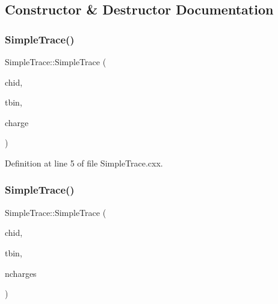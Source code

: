 \subsection{Constructor \& Destructor Documentation}
\mbox{\label{class_wire_cell_1_1_simple_trace_aabf3ae415f8952a19073c58de4702018}} 
\subsubsection{\texorpdfstring{Simple\+Trace()}{SimpleTrace()}\hspace{0.1cm}{\footnotesize\ttfamily [1/2]}}
{\footnotesize\ttfamily Simple\+Trace\+::\+Simple\+Trace (\begin{DoxyParamCaption}\item[{int}]{chid,  }\item[{int}]{tbin,  }\item[{const \hyperlink{class_wire_cell_1_1_i_trace_a3dab103257bc46bfd486966f69836954}{Charge\+Sequence} \&}]{charge }\end{DoxyParamCaption})}



Definition at line 5 of file Simple\+Trace.\+cxx.

\mbox{\label{class_wire_cell_1_1_simple_trace_a8c96686d2523f393352355abce319642}} 
\subsubsection{\texorpdfstring{Simple\+Trace()}{SimpleTrace()}\hspace{0.1cm}{\footnotesize\ttfamily [2/2]}}
{\footnotesize\ttfamily Simple\+Trace\+::\+Simple\+Trace (\begin{DoxyParamCaption}\item[{int}]{chid,  }\item[{int}]{tbin,  }\item[{size\+\_\+t}]{ncharges }\end{DoxyParamCaption})}



